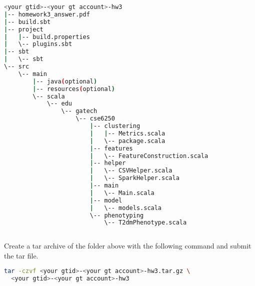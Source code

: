 \documentclass[12pt]{article}
\begin{document}
\begin{lstlisting}[language=bash,frame=single]
<your gtid>-<your gt account>-hw3
|-- homework3_answer.pdf
|-- build.sbt
|-- project
|   |-- build.properties
|   \-- plugins.sbt
|-- sbt
|   \-- sbt
\-- src
    \-- main
        |-- java(optional)
        |-- resources(optional)
        \-- scala
            \-- edu
                \-- gatech
                    \-- cse6250
                        |-- clustering
                        |   |-- Metrics.scala
                        |   \-- package.scala
                        |-- features
                        |   \-- FeatureConstruction.scala
                        |-- helper
                        |   \-- CSVHelper.scala
                        |   \-- SparkHelper.scala
                        |-- main
                        |   \-- Main.scala
                        |-- model
                        |   \-- models.scala
                        \-- phenotyping
                            \-- T2dmPhenotype.scala
   
\end{lstlisting}
Create a tar archive of the folder above with the following command and submit the tar file.
\begin{lstlisting}[language=bash,frame=single]
tar -czvf <your gtid>-<your gt account>-hw3.tar.gz \
  <your gtid>-<your gt account>-hw3
\end{lstlisting}
\end{document}
